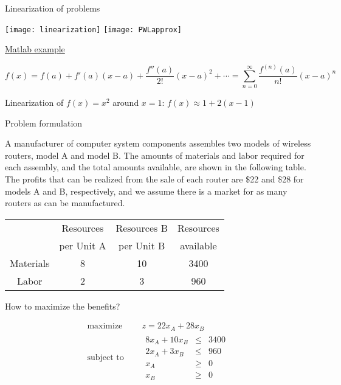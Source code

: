 \documentclass[c]{beamer}
\begin{document}
\begin{frame}{Linearization of problems}
  \begin{center}
    \texttt{[image: linearization]}
    \texttt{[image: PWLapprox]}

  \href{https://es.mathworks.com/help/slcontrol/ug/linearizing-nonlinear-models.html}{Matlab example}
  \end{center}
\[
f(x) = f(a) + f'(a)(x - a) + \frac{f''(a)}{2!}(x - a)^2 + \cdots = \sum_{n=0}^{\infty} \frac{f^{(n)}(a)}{n!}(x - a)^n
\]

Linearization of \( f(x) = x^2 \) around \( x = 1 \): $f(x) \approx 1 + 2(x - 1) $
\end{frame}

\begin{frame}[allowframebreaks]{Problem formulation}
  \begin{Exercise}
    A manufacturer of computer system components assembles two models of wireless routers, model A and model B. The amounts of materials and labor required for each assembly, and the total amounts available, are shown in the following table. The profits that can be realized from the sale of each router are \$22 and \$28 for models A and B, respectively, and we assume there is a market for as many routers as can be manufactured.\cite{carter}
    \begin{center}
    \begin{tabular}{cccc}
      & Resources  & Resources  B & Resources  \\
      & per Unit A &  per Unit B &  available \\\hline
      Materials & 8 & 10 & 3400\\
      Labor & 2 & 3 & 960\\\hline
    \end{tabular}
  \end{center}
  How to maximize the benefits?
  \end{Exercise}
  \framebreak
  \begin{equation*}
    \begin{aligned}
      \text{maximize } \quad & z = 22 x_A+28x_B \\
      \text{subject to }\quad &
      \begin{array}{rcl}
        8x_A+10x_B &\leq &3400 \\
        2x_A+3x_B &\leq &960 \\
        x_A &\geq &0 \\
        x_B &\geq& 0
      \end{array}
    \end{aligned}
  \end{equation*}


\end{frame}
\end{document}
